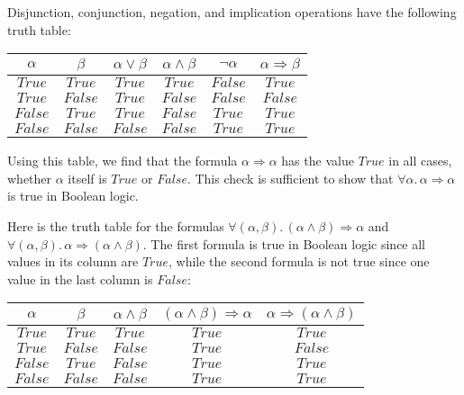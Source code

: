 Disjunction, conjunction, negation, and implication operations have
the following truth table:
\begin{center}
{\small{}}%
\begin{tabular}{|c|c|c|c|c|c|}
\hline 
{\small{}$\alpha$} & {\small{}$\beta$} & \textbf{\small{}$\alpha\vee\beta$} & \textbf{\small{}$\alpha\wedge\beta$} & \textbf{\small{}$\neg\alpha$} & \textbf{\small{}$\alpha\Rightarrow\beta$}\tabularnewline
\hline 
\hline 
{\small{}$True$} & {\small{}$True$} & {\small{}$True$} & {\small{}$True$} & {\small{}$False$} & {\small{}$True$}\tabularnewline
\hline 
{\small{}$True$} & {\small{}$False$} & {\small{}$True$} & {\small{}$False$} & {\small{}$False$} & {\small{}$False$}\tabularnewline
\hline 
{\small{}$False$} & {\small{}$True$} & {\small{}$True$} & {\small{}$False$} & {\small{}$True$} & {\small{}$True$}\tabularnewline
\hline 
{\small{}$False$} & {\small{}$False$} & {\small{}$False$} & {\small{}$False$} & {\small{}$True$} & {\small{}$True$}\tabularnewline
\hline 
\end{tabular}{\small\par}
\par\end{center}

Using this table, we find that the formula $\alpha\Rightarrow\alpha$
has the value $True$ in all cases, whether $\alpha$ itself is $True$
or $False$. This check is sufficient to show that $\forall\alpha.\,\alpha\Rightarrow\alpha$
is true in Boolean logic.

Here is the truth table for the formulas $\forall(\alpha,\beta).\,(\alpha\wedge\beta)\Rightarrow\alpha$
and $\forall(\alpha,\beta).\,\alpha\Rightarrow(\alpha\wedge\beta)$.
The first formula is true in Boolean logic since all values in its
column are $True$, while the second formula is not true since one
value in the last column is $False$:
\begin{center}
{\small{}}%
\begin{tabular}{|c|c|c|c|c|}
\hline 
{\small{}$\alpha$} & {\small{}$\beta$} & \textbf{\small{}$\alpha\wedge\beta$} & {\small{}$(\alpha\wedge\beta)\Rightarrow\alpha$} & {\small{}$\alpha\Rightarrow(\alpha\wedge\beta)$}\tabularnewline
\hline 
\hline 
{\small{}$True$} & {\small{}$True$} & {\small{}$True$} & {\small{}$True$} & {\small{}$True$}\tabularnewline
\hline 
{\small{}$True$} & {\small{}$False$} & {\small{}$False$} & {\small{}$True$} & {\small{}$False$}\tabularnewline
\hline 
{\small{}$False$} & {\small{}$True$} & {\small{}$False$} & {\small{}$True$} & {\small{}$True$}\tabularnewline
\hline 
{\small{}$False$} & {\small{}$False$} & {\small{}$False$} & {\small{}$True$} & {\small{}$True$}\tabularnewline
\hline 
\end{tabular}{\small\par}
\par\end{center}

